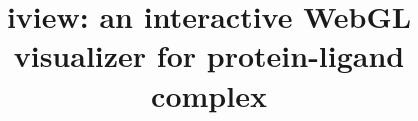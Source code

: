 \documentclass[twocolumn]{bmcart}%
\begin{document}
\begin{frontmatter}

\begin{fmbox}


\title{iview: an interactive WebGL visualizer for protein-ligand complex}


\author[
   addressref={aff1},                   %
   corref={aff1},                       %
   email={jackyleehongjian@gmail.com}   %
]{ }
\author[
   addressref={aff1},                   %
   email={ksleung@cse.cuhk.edu.hk}
]{ }
\author[
   addressref={aff2},
   email={nakane.t@gmail.com}
]{ }
\author[
   addressref={aff1},                   %
   email={mhwong@cse.cuhk.edu.hk}
]{ }


\address[id=aff1]{%
  , %
  ,                              %
}
\address[id=aff2]{%
  ,
  ,
}


\end{fmbox}
\end{frontmatter}
\end{document}
